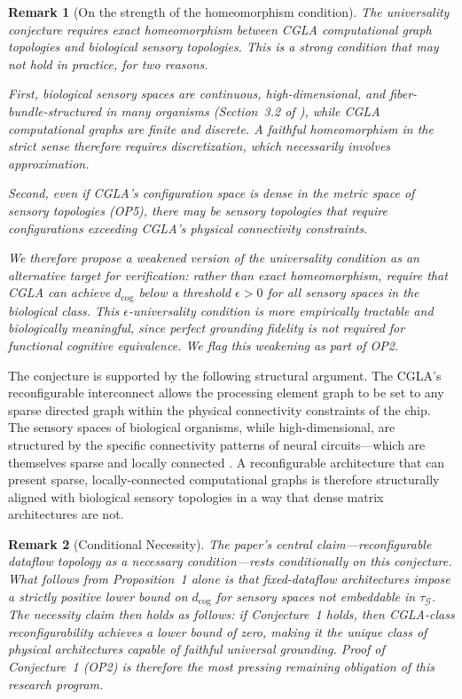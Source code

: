 \documentclass[12pt]{article}
\newtheorem{remark}{Remark}
\begin{document}
\begin{remark}[On the strength of the homeomorphism condition]
The universality conjecture requires exact homeomorphism between
CGLA computational graph topologies and biological sensory topologies.
This is a strong condition that may not hold in practice, for two
reasons.

First, biological sensory spaces are continuous, high-dimensional,
and fiber-bundle-structured in many organisms (Section~3.2 of
\cite{minamoto2026topology}), while CGLA computational graphs are finite and
discrete. A faithful homeomorphism in the strict sense therefore
requires discretization, which necessarily involves approximation.

Second, even if CGLA's configuration space is dense in the metric
space of sensory topologies (OP5), there may be sensory topologies
that require configurations exceeding CGLA's physical connectivity
constraints.

We therefore propose a weakened version of the universality condition
as an alternative target for verification: rather than exact
homeomorphism, require that CGLA can achieve $d_{\mathrm{cog}}$
below a threshold $\epsilon > 0$ for all sensory spaces in the
biological class. This $\epsilon$-universality condition is more
empirically tractable and biologically meaningful, since perfect
grounding fidelity is not required for functional cognitive
equivalence. We flag this weakening as part of OP2.
\end{remark}

The conjecture is supported by the following structural argument. The
CGLA's reconfigurable interconnect allows the processing element graph
to be set to any sparse directed graph within the physical connectivity
constraints of the chip. The sensory spaces of biological organisms, while
high-dimensional, are structured by the specific connectivity patterns of
neural circuits---which are themselves sparse and locally connected
\cite{white1986, scheffer2020}. A reconfigurable architecture that can
present sparse, locally-connected computational graphs is therefore
structurally aligned with biological sensory topologies in a way that
dense matrix architectures are not.

\begin{remark}[Conditional Necessity]
The paper's central claim---reconfigurable dataflow topology as a
\emph{necessary} condition---rests conditionally on this conjecture.
What follows from Proposition~1 alone is that fixed-dataflow
architectures impose a strictly positive lower bound on
$d_{\mathrm{cog}}$ for sensory spaces not embeddable in
$\tau_{\mathcal{G}}$. The necessity claim then holds as follows: if
Conjecture~1 holds, then CGLA-class reconfigurability achieves a lower
bound of zero, making it the unique class of physical architectures
capable of faithful universal grounding. Proof of Conjecture~1 (OP2)
is therefore the most pressing remaining obligation of this research
program.
\end{remark}
\end{document}
